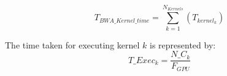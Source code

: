 \documentclass[conference]{IEEEtran}
\begin{document}
% 
% 



{\scriptsize
\begin{equation}
T_{BWA\_Kernel\_time} = \sum_{k = 1}^{N_{Kernels}}(T_{kernel_k})
\end{equation}
}%

% 
% 

The time taken for executing kernel $k$ is represented by:
{\scriptsize
\begin{equation}\label{e15}
T\_Exec_k = \frac{N\_C_k}{F_{GPU}} 
\end{equation}
}%

% 
% 
% 
\end{document}
